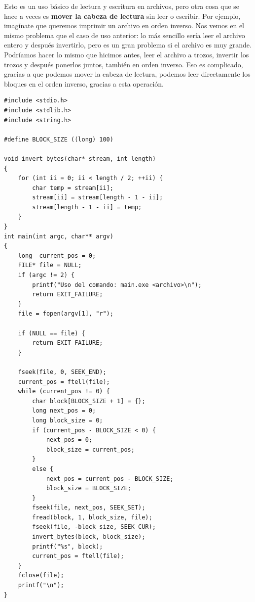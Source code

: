 \documentclass[a4paper]{article}
\begin{document}
Esto es un uso básico de lectura y escritura en archivos, pero otra cosa que se
hace a veces es \textbf{mover la cabeza de lectura} sin leer o escribir.
Por ejemplo, imagínate que queremos imprimir un archivo en orden inverso.
Nos vemos en el mismo problema que el caso de uso anterior: lo más sencillo
sería leer el archivo entero y después invertirlo, pero es un gran problema
si el archivo es muy grande. Podríamos hacer lo mismo que hicimos antes, leer
el archivo a trozos, invertir los trozos y después ponerlos juntos, también
en orden inverso. Eso es complicado, gracias a que podemos mover la cabeza
de lectura, podemos leer directamente los bloques en el orden inverso, gracias
a esta operación.


\noindent
\begin{minipage}[H]{\linewidth}
\mbox{}
\begin{lstlisting}[style=C,
caption={Ejemplo de uso de funciones para mover la cabeza de lectura},
label={lst:fseek}]
#include <stdio.h>
#include <stdlib.h>
#include <string.h>

#define BLOCK_SIZE ((long) 100)

void invert_bytes(char* stream, int length)
{
    for (int ii = 0; ii < length / 2; ++ii) {
        char temp = stream[ii];
        stream[ii] = stream[length - 1 - ii];
        stream[length - 1 - ii] = temp;
    }
}
int main(int argc, char** argv)
{
    long  current_pos = 0;
    FILE* file = NULL;
    if (argc != 2) {
        printf("Uso del comando: main.exe <archivo>\n");
        return EXIT_FAILURE;
    }
    file = fopen(argv[1], "r");

    if (NULL == file) {
        return EXIT_FAILURE;
    }

    fseek(file, 0, SEEK_END);
    current_pos = ftell(file);
    while (current_pos != 0) {
        char block[BLOCK_SIZE + 1] = {};
        long next_pos = 0;
        long block_size = 0;
        if (current_pos - BLOCK_SIZE < 0) {
            next_pos = 0;
            block_size = current_pos;
        }
        else {
            next_pos = current_pos - BLOCK_SIZE;
            block_size = BLOCK_SIZE;
        }
        fseek(file, next_pos, SEEK_SET);
        fread(block, 1, block_size, file);
        fseek(file, -block_size, SEEK_CUR);
        invert_bytes(block, block_size);
        printf("%s", block);
        current_pos = ftell(file);
    }
    fclose(file);
    printf("\n");
}
\end{lstlisting}
\end{minipage}
\end{document}
